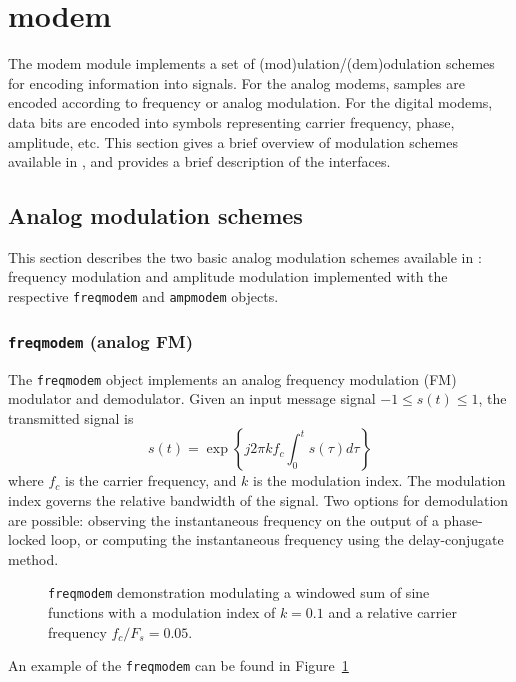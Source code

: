 % 
%

\newpage
\section{modem}
\label{module:modem}
The modem module implements a set of (mod)ulation/(dem)odulation schemes
for encoding information into signals.
For the analog modems, samples are encoded according to frequency or
analog modulation.
For the digital modems, data bits are encoded into symbols representing
carrier frequency, phase, amplitude, etc.
This section gives a brief overview of modulation schemes available in
\liquid, and provides a brief description of the interfaces.


%
%

\subsection{Analog modulation schemes}
\label{module:modem:analog}
This section describes the two basic analog modulation schemes available
in \liquid:
frequency modulation and amplitude modulation
implemented with the respective {\tt freqmodem} and {\tt ampmodem}
objects.

\subsubsection{{\tt freqmodem} (analog FM)}
\label{module:modem:analog:freqmodem}
The {\tt freqmodem} object implements an analog frequency modulation
(FM) modulator and demodulator.
Given an input message signal $-1 \le s(t) \le 1$, the transmitted
signal is
%
\begin{equation}
\label{eqn:modem:freqmodem_tx}
    s(t) =  \exp\left\{
                j 2 \pi k f_c
                \int_{0}^{t}{
                    s(\tau)d\tau
                }
            \right\}
\end{equation}
%
where $f_c$ is the carrier frequency, and $k$ is the modulation index.
The modulation index governs the relative bandwidth of the signal.
Two options for demodulation are possible:
observing the instantaneous frequency on the output of a phase-locked
loop,
or computing the instantaneous frequency using the delay-conjugate
method.
%
%
\begin{figure}
\centering
{}
\caption{{\tt freqmodem} demonstration modulating a windowed sum of sine
         functions with 
         a modulation index of $k=0.1$
         and a relative carrier frequency $f_c/F_s = 0.05$.}
\label{fig:modem:freqmodem}
\end{figure}
%
An example of the {\tt freqmodem} can be found in
Figure~\ref{fig:modem:freqmodem}

